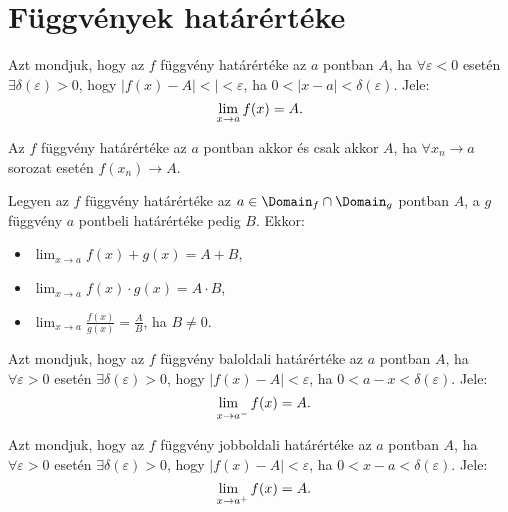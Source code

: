 \section{Függvények határértéke}

\begin{definition}
  Azt mondjuk, hogy az $f$ függvény határértéke az $a$ pontban $A$, ha $\forall
    \varepsilon < 0$ esetén $\exists \delta(\varepsilon) > 0$, hogy $|f(x) - A| <
    | < \varepsilon$, ha $0 < |x - a| < \delta(\varepsilon)$. Jele:
  \[
    \lim_{x \rightarrow a} f(x) = A
    \text.
  \]
\end{definition}

\begin{theorem}
  Az $f$ függvény határértéke az $a$ pontban akkor és csak akkor $A$, ha
  $\forall x_n \rightarrow a$ sorozat esetén $f(x_n) \rightarrow A$.
\end{theorem}

\begin{theorem}
  Legyen az $f$ függvény határértéke az $a \in \Domain_f \cap \Domain_g$ pontban
  $A$, a $g$ függvény $a$ pontbeli határértéke pedig $B$. Ekkor:
  \begin{itemize}
    \item $\displaystyle \lim_{x \rightarrow a} f(x) + g(x) = A + B$,
    \item $\displaystyle \lim_{x \rightarrow a} f(x) \cdot g(x) = A \cdot B$,
    \item $\displaystyle \lim_{x \rightarrow a} \frac{f(x)}{g(x)} = \frac{A}{B}$,
          ha  $B \neq 0$.
  \end{itemize}
\end{theorem}

\begin{definition}
  Azt mondjuk, hogy az $f$ függvény baloldali határértéke az $a$ pontban $A$, ha
  $\forall \varepsilon > 0$ esetén $\exists \delta(\varepsilon) > 0$, hogy
  $|f(x) - A| < \varepsilon$, ha $0 < a - x < \delta(\varepsilon)$. Jele:
  \[
    \lim_{\phantom{{}^-}x \rightarrow a^-} f(x) = A
    \text.
  \]
\end{definition}

\begin{definition}
  Azt mondjuk, hogy az $f$ függvény jobboldali határértéke az $a$ pontban $A$,
  ha $\forall \varepsilon > 0$ esetén $\exists \delta(\varepsilon) > 0$, hogy
  $|f(x) - A| < \varepsilon$, ha $0 < x - a < \delta(\varepsilon)$.
  Jele:
  \[
    \lim_{\phantom{{}^+}x \rightarrow a^+} f(x) = A
    \text.
  \]
\end{definition}

